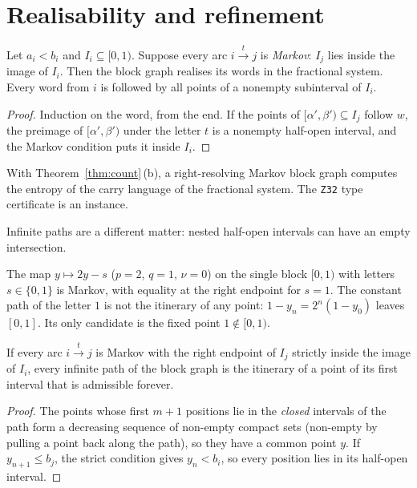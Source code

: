 \section{Realisability and refinement}

\begin{theorem}\label{thm:markov}
Let \(a_i<b_i\) and \(I_i\subseteq[0,1)\). Suppose every arc \(i\xrightarrow{t}j\) is
\emph{Markov}: \(I_j\) lies inside the image of \(I_i\). Then the block graph realises its
words in the fractional system. Every word from \(i\) is followed by all points of a nonempty
subinterval of \(I_i\).
\end{theorem}

\begin{proof}
Induction on the word, from the end. If the points of \([\alpha',\beta')\subseteq I_j\) follow
\(w\), the preimage of \([\alpha',\beta')\) under the letter \(t\) is a nonempty half-open
interval, and the Markov condition puts it inside \(I_i\).
\end{proof}

With Theorem~\ref{thm:count}\,(b), a right-resolving Markov block graph computes the entropy of
the carry language of the fractional system. The \texttt{Z32} type certificate is an instance.

Infinite paths are a different matter: nested half-open intervals can have an empty
intersection.

\begin{example}\label{ex:doubling}
The map \(y\mapsto 2y-s\) (\(p=2\), \(q=1\), \(\nu=0\)) on the single block \([0,1)\) with
letters \(s\in\{0,1\}\) is Markov, with equality at the right endpoint for \(s=1\). The constant
path of the letter \(1\) is not the itinerary of any point: \(1-y_n=2^n(1-y_0)\) leaves \([0,1]\).
Its only candidate is the fixed point \(1\notin[0,1)\).
\end{example}

\begin{theorem}\label{thm:markov-inf}
If every arc \(i\xrightarrow{t}j\) is Markov with the right endpoint of \(I_j\) strictly inside the
image of \(I_i\), every infinite path of the block graph is the itinerary of a point of its first
interval that is admissible forever.
\end{theorem}

\begin{proof}
The points whose first \(m+1\) positions lie in the \emph{closed} intervals of the path form a
decreasing sequence of non-empty compact sets (non-empty by pulling a point back along the
path), so they have a common point \(y\). If \(y_{n+1}\le b_{j}\), the strict condition gives
\(y_n<b_i\), so every position lies in its half-open interval.
\end{proof}

